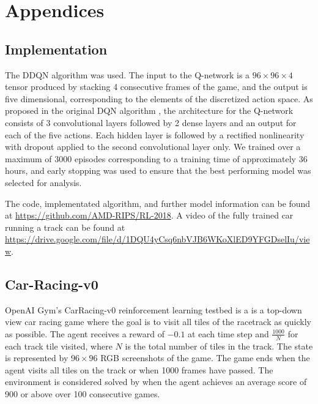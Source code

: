 \documentclass{article}
\begin{document}
\section{Appendices}
\subsection{Implementation}
The DDQN algorithm \cite{DDQN} was used. The input
to the Q-network is a $96\times96\times4$ tensor produced by stacking
4 consecutive frames of the game, and the output is five dimensional,
corresponding to the elements of the discretized action space. As
proposed in the original DQN algorithm \cite{DQN}, the architecture
for the Q-network consists of 3 convolutional layers followed by 2
dense layers and an output for each of the five actions. Each hidden
layer is followed by a rectified nonlinearity with dropout applied to
the second convolutional layer only. We trained over a maximum of 3000
episodes corresponding to a training time of approximately 36 hours,
and early stopping was used to ensure that the best performing model
was selected for analysis. 


The code, implementated algorithm, and further model information can
be found at \url{https://github.com/AMD-RIPS/RL-2018}. A video of the
fully trained car running a track can be found at
\url{https://drive.google.com/file/d/1DQU4yCsq6nbVJB6WKoXlED9YFGDselIu/view}. 

\subsection{Car-Racing-v0}

OpenAI Gym’s CarRacing-v0 reinforcement learning testbed
\cite{CarRacing} is a is a top-down view car racing game where the
goal is to visit all tiles of the racetrack as quickly as
possible. The agent receives a reward of $-0.1$ at each time step and
$\frac{1000}{N}$ for each track tile visited, where $N$ is the total
number of tiles in the track. The state is represented by $96\times96$
RGB screenshots of the game. The game ends when the agent visits all
tiles on the track or when 1000 frames have passed. The environment is
considered solved by when the agent achieves an average score of 900
or above over 100 consecutive games. 
\end{document}
